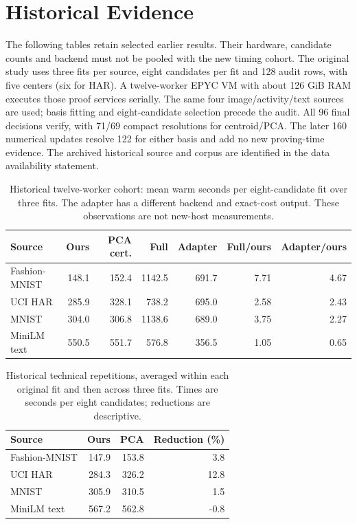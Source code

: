\documentclass[5p,times,twocolumn]{elsarticle}
\begin{document}
\section{Historical Evidence}
\label{app:historical}
The following tables retain selected earlier results. Their hardware,
candidate counts and backend must not be pooled with the new timing
cohort. The original study uses three fits per source, eight candidates
per fit and 128 audit rows, with five centers (six for HAR). A twelve-worker
EPYC VM with about 126 GiB RAM executes those proof services serially.
The same four image/activity/text sources are used; basis fitting and
eight-candidate selection precede the audit. All 96 final decisions verify,
with 71/69 compact resolutions for centroid/PCA. The later 160 numerical
updates resolve 122 for either basis and add no new proving-time evidence.
The archived historical source and corpus are identified in the data
availability statement.

\begin{table}[H]
\centering\small
\caption{Historical twelve-worker cohort: mean warm seconds per eight-candidate fit over three fits. The adapter has a different backend and exact-cost output. These observations are not new-host measurements.}
\label{tab:server-warm}
\begin{tabular}{@{}lrrrrrr@{}}
\toprule
Source & Ours & PCA cert. & Full & Adapter & Full/ours & Adapter/ours\\
\midrule
Fashion-MNIST & 148.1 & 152.4 & 1142.5 & 691.7 & 7.71 & 4.67\\
UCI HAR & 285.9 & 328.1 & 738.2 & 695.0 & 2.58 & 2.43\\
MNIST & 304.0 & 306.8 & 1138.6 & 689.0 & 3.75 & 2.27\\
MiniLM text & 550.5 & 551.7 & 576.8 & 356.5 & 1.05 & 0.65\\
\bottomrule
\end{tabular}
\end{table}

\begin{table}[H]
\centering\small
\caption{Historical technical repetitions, averaged within each original fit and then across three fits. Times are seconds per eight candidates; reductions are descriptive.}
\label{tab:revision-timing}
\begin{tabular}{@{}lrrr@{}}
\toprule
Source & Ours & PCA & Reduction (\%)\\
\midrule
Fashion-MNIST & 147.9 & 153.8 & 3.8\\
UCI HAR & 284.3 & 326.2 & 12.8\\
MNIST & 305.9 & 310.5 & 1.5\\
MiniLM text & 567.2 & 562.8 & -0.8\\
\bottomrule
\end{tabular}
\end{table}
\end{document}
